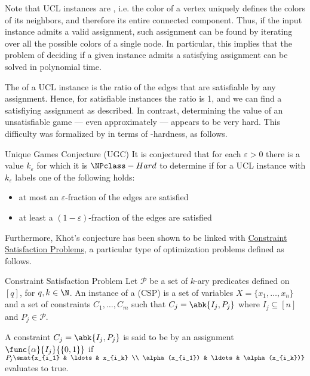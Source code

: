 \documentclass[a4paper, 12pt]{report}
\begin{document}
    Note that UCL instances are , i.e. the color of a vertex uniquely defines the colors of its neighbors, and therefore its entire connected component. Thus, if the input instance admits a valid assignment, such assignment can be found  by iterating over all the possible colors of a single node. In particular, this implies that the problem of deciding if a given instance admits a satisfying assignment can be solved in polynomial time.

    The  of a UCL instance is the ratio of the edges that are satisfiable by any assignment. Hence, for satisfiable instances the ratio is 1, and we can find a satisfiying assignment as described. In contrast, determining the value of an unsatisfiable game --- even approximately --- appears to be very hard. This difficulty was formalized by \textcite{khot} in terms of \NPclass-hardness, as follows.

    \begin{framedconj}{Unique Games Conjecture (UGC)}
        It is conjectured that for each $\varepsilon > 0$ there is a value $k_\varepsilon$ for which it is $\NPclass-Hard$ to determine if for a UCL instance with $k_\varepsilon$ labels one of the following holds:

        \begin{itemize}
            \item at most an $\varepsilon$-fraction of the edges are satisfied
            \item at least a $(1 - \varepsilon)$-fraction of the edges are satisfied
        \end{itemize}
    \end{framedconj}

    Furthermore, Khot's conjecture has been shown to be linked with \href{https://en.wikipedia.org/wiki/Constraint_satisfaction_problem}{Constraint Satisfaction Problems}, a particular type of optimization problems defined as follows.

    \begin{frameddefn}{Constraint Satisfaction Problem}
        Let $\mathcal P$ be a set of $k$-ary predicates defined on $[q]$, for $q, k \in \N$. An instance of a  (CSP) is a set of variables $X = \{x_1, \ldots, x_n\}$ and a set of constraints $C_1, \ldots, C_m$ such that $C_j = \abk{I_j, P_j}$ where $I_j \subseteq [n]$ and $P_j \in \mathcal P$.

        A constraint $C_j = \abk{I_j, P_j}$ is said to be  by an assignment $\func{\alpha}{I_j}{\{0, 1\}}$ if $P_j \smat{x_{i_1} & \ldots & x_{i_k} \\ \alpha(x_{i_1}) & \ldots & \alpha(x_{i_k})}$ evaluates to true.
    \end{frameddefn}
\end{document}
